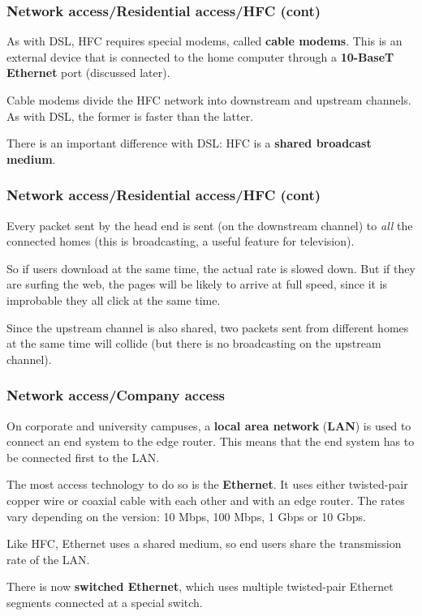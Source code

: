 %
\begin{frame}
\frametitle{Network access/Residential access/HFC (cont)}

As with DSL, HFC requires special modems, called \textbf{cable
modems}. This is an external device that is connected to the home
computer through a \textbf{10-BaseT Ethernet} port (discussed later).

\bigskip

Cable modems divide the HFC network into downstream and upstream
channels. As with DSL, the former is faster than the latter.

\bigskip

There is an important difference with DSL: HFC is a \textbf{shared
broadcast medium}.

\end{frame}

%
\begin{frame}
\frametitle{Network access/Residential access/HFC (cont)}

Every packet sent by the head end is sent (on the downstream channel)
to \emph{all} the connected homes (this is broadcasting, a useful
feature for television).

\bigskip

So if users download at the same time, the actual rate is slowed
down. But if they are surfing the web, the pages will be likely to
arrive at full speed, since it is improbable they all click at the
same time.

\bigskip

Since the upstream channel is also shared, two packets sent from
different homes at the same time will collide (but there is no
broadcasting on the upstream channel).

\end{frame}

%
\begin{frame}
\frametitle{Network access/Company access}

On corporate and university campuses, a \textbf{local area network}
(\textbf{LAN}) is used to connect an end system to the edge
router. This means that the end system has to be connected first to
the LAN.

\bigskip

The most access technology to do so is the \textbf{Ethernet}. It uses
either twisted-pair copper wire or coaxial cable with each other and
with an edge router. The rates vary depending on the version: 10 Mbps,
100 Mbps, 1 Gbps or 10 Gbps.

\bigskip

Like HFC, Ethernet uses a shared medium, so end users share the
transmission rate of the LAN.

\bigskip

There is now \textbf{switched Ethernet}, which uses multiple
twisted-pair Ethernet segments connected at a special switch.

\end{frame}

